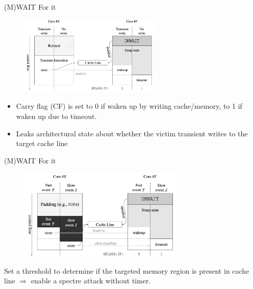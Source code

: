 \documentclass{beamer}
\begin{document}
\begin{frame}{(M)WAIT For it\cite{mwait}}
\begin{figure}
    \begin{center}
    \includegraphics[width=0.6\textwidth]{img/twm.png}
    \end{center}
\end{figure}
\begin{itemize}
    \item Carry flag (CF) is set to 0 if waken up by writing cache/memory, to 1 if waken up due to timeout.
    \item Leaks architectural state about whether the victim transient writes to the target cache line
\end{itemize}
\end{frame}

\begin{frame}{(M)WAIT For it\cite{mwait}}
\begin{figure}
    \begin{center}
    \includegraphics[width=0.7\textwidth]{img/tlt.png}
    \end{center}
\end{figure}
Set a threshold to determine if the targeted memory region is present in cache line $\Rightarrow$ enable a spectre attack without timer.
\end{frame}
\end{document}
